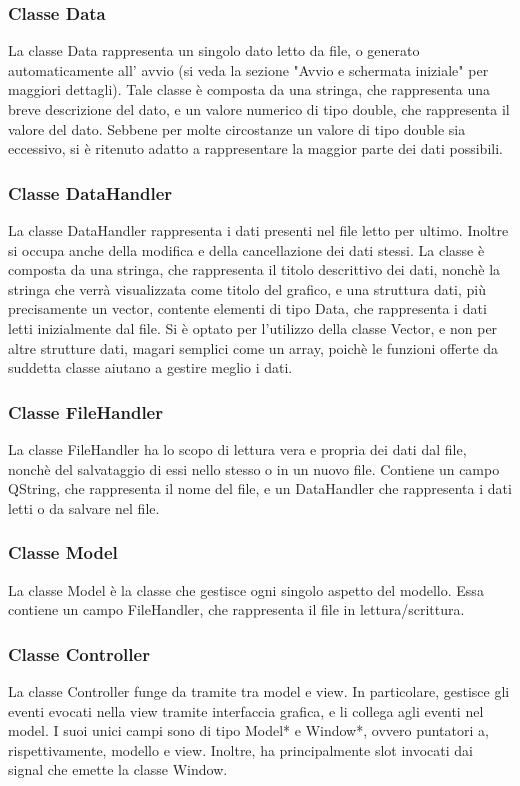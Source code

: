 \documentclass[10pt]{article}
\begin{document}
    \subsubsection{Classe Data}
    La classe Data rappresenta un singolo dato letto da file, o generato automaticamente all' avvio (si veda la sezione "Avvio e schermata iniziale" per maggiori dettagli).
    Tale classe è composta da una stringa, che rappresenta una breve descrizione del dato, e un valore numerico di tipo double, che rappresenta il valore del dato. Sebbene per molte circostanze un valore di tipo double sia eccessivo, si è ritenuto adatto a rappresentare la maggior parte dei dati possibili.
    \subsubsection{Classe DataHandler}
    La classe DataHandler rappresenta i dati presenti nel file letto per ultimo. Inoltre si occupa anche della modifica e della cancellazione dei dati stessi.
    La classe è composta da una stringa, che rappresenta il titolo descrittivo dei dati, nonchè la stringa che verrà visualizzata come titolo del grafico, e una struttura dati, più precisamente un vector, contente elementi di tipo Data, che rappresenta i dati letti inizialmente dal file.
    Si è optato per l'utilizzo della classe Vector, e non per altre strutture dati, magari semplici come un array, poichè le funzioni offerte da suddetta classe aiutano a gestire meglio i dati.
    \subsubsection{Classe FileHandler}
    La classe FileHandler ha lo scopo di lettura vera e propria dei dati dal file, nonchè del salvataggio di essi nello stesso o in un nuovo file. Contiene un campo QString, che rappresenta il nome del file, e un DataHandler che rappresenta i dati letti o da salvare nel file.
    \subsubsection{Classe Model}
    La classe Model è la classe che gestisce ogni singolo aspetto del modello. Essa contiene un campo FileHandler, che rappresenta  il file in lettura/scrittura.
    \subsubsection{Classe Controller}
    La classe Controller funge da tramite tra model e view. In particolare, gestisce gli eventi evocati nella view tramite interfaccia grafica, e li collega agli eventi nel model. I suoi unici campi sono di tipo Model* e Window*, ovvero puntatori a, rispettivamente, modello e view. Inoltre, ha principalmente slot invocati dai signal che emette la classe Window.
\end{document}
